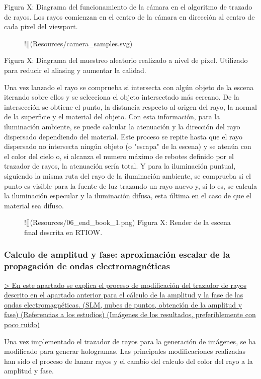\documentclass[10pt, a4paper]{article}
\begin{document}
Figura X: Diagrama del funcionamiento de la cámara en el algoritmo de trazado de rayos. Los rayos comienzan en el centro de la cámara en dirección al centro de cada pixel del viewport.


\begin{figure}[h] 
![](Resources/camera_samples.svg)
\end{figure}

Figura X: Diagrama del muestreo aleatorio realizado a nivel de píxel. Utilizado para reducir el aliasing y aumentar la calidad.

Una vez lanzado el rayo se comprueba si intersecta con algún objeto de la escena iterando sobre ellos y se selecciona el objeto intersectado más cercano. De la intersección se obtiene el punto, la distancia respecto al origen del rayo, la normal de la superficie y el material del objeto. Con esta información, para la iluminación ambiente, se puede calcular la atenuación y la dirección del rayo dispersado dependiendo del material. Este proceso se repite hasta que el rayo dispersado no intersecta ningún objeto (o "escapa" de la escena) y se atenúa con el color del cielo o, si alcanza el numero máximo de rebotes definido por el trazador de rayos, la atenuación sería total. Y para la iluminación puntual, siguiendo la misma ruta del rayo de la iluminación ambiente, se comprueba si el punto es visible para la fuente de luz trazando un rayo nuevo y, si lo es, se calcula la iluminación especular y la iluminación difusa, esta última en el caso de que el material sea difuso. 


\begin{figure}[h] 
![](Resources/06_end_book_1.png)            
Figura X: Render de la escena final descrita en RTIOW.
\end{figure}

\subsubsection{Calculo de amplitud y fase: aproximación escalar de la propagación de ondas electromagnéticas}

\underline{> En este apartado se explica el proceso de modificación del trazador de rayos descrito en el apartado anterior para el cálculo de la amplitud y la fase de las ondas electromagnéticas. (SLM, nubes de puntos, obtención de la amplitud y fase) (Referencias a los estudios) (Imágenes de los resultados, preferiblemente con poco ruido)}

Una vez implementado el trazador de rayos para la generación de imágenes, se ha modificado para generar hologramas. Las principales modificaciones realizadas han sido el proceso de lanzar rayos y el cambio del calculo del color del rayo a la amplitud y fase.
\end{document}
